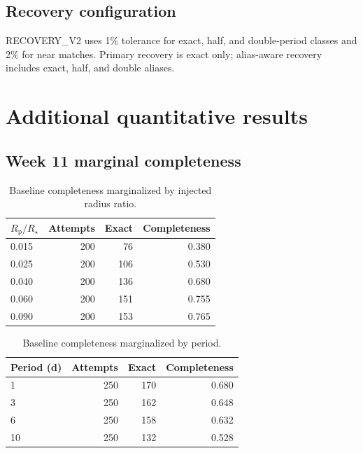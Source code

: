 \documentclass[11pt]{article}
\newcommand{\rprs}{$R_{\mathrm p}/R_\star$}
\begin{document}
\subsection{Recovery configuration}
\textsc{RECOVERY\_V2} uses 1\% tolerance for exact, half, and double-period classes and 2\% for near matches. Primary recovery is exact only; alias-aware recovery includes exact, half, and double aliases.

\section{Additional quantitative results}
\subsection{Week 11 marginal completeness}
\begin{table}[htbp]
\centering
\caption{Baseline completeness marginalized by injected radius ratio.}
\small
\begin{tabular}{lrrr}
\toprule
\rprs & Attempts & Exact & Completeness\\
\midrule
0.015 & 200 & 76  & 0.380\\
0.025 & 200 & 106 & 0.530\\
0.040 & 200 & 136 & 0.680\\
0.060 & 200 & 151 & 0.755\\
0.090 & 200 & 153 & 0.765\\
\bottomrule
\end{tabular}
\end{table}

\begin{table}[htbp]
\centering
\caption{Baseline completeness marginalized by period.}
\small
\begin{tabular}{lrrr}
\toprule
Period (d) & Attempts & Exact & Completeness\\
\midrule
1  & 250 & 170 & 0.680\\
3  & 250 & 162 & 0.648\\
6  & 250 & 158 & 0.632\\
10 & 250 & 132 & 0.528\\
\bottomrule
\end{tabular}
\end{table}
\end{document}
